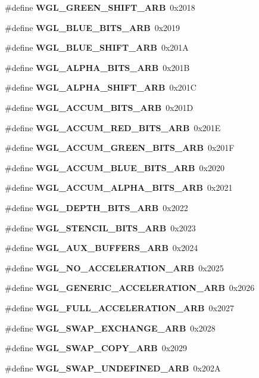 \begin{DoxyCompactItemize}
\item 
\#define {\bf W\+G\+L\+\_\+\+G\+R\+E\+E\+N\+\_\+\+S\+H\+I\+F\+T\+\_\+\+A\+RB}~0x2018
\item 
\#define {\bf W\+G\+L\+\_\+\+B\+L\+U\+E\+\_\+\+B\+I\+T\+S\+\_\+\+A\+RB}~0x2019
\item 
\#define {\bf W\+G\+L\+\_\+\+B\+L\+U\+E\+\_\+\+S\+H\+I\+F\+T\+\_\+\+A\+RB}~0x201A
\item 
\#define {\bf W\+G\+L\+\_\+\+A\+L\+P\+H\+A\+\_\+\+B\+I\+T\+S\+\_\+\+A\+RB}~0x201B
\item 
\#define {\bf W\+G\+L\+\_\+\+A\+L\+P\+H\+A\+\_\+\+S\+H\+I\+F\+T\+\_\+\+A\+RB}~0x201C
\item 
\#define {\bf W\+G\+L\+\_\+\+A\+C\+C\+U\+M\+\_\+\+B\+I\+T\+S\+\_\+\+A\+RB}~0x201D
\item 
\#define {\bf W\+G\+L\+\_\+\+A\+C\+C\+U\+M\+\_\+\+R\+E\+D\+\_\+\+B\+I\+T\+S\+\_\+\+A\+RB}~0x201E
\item 
\#define {\bf W\+G\+L\+\_\+\+A\+C\+C\+U\+M\+\_\+\+G\+R\+E\+E\+N\+\_\+\+B\+I\+T\+S\+\_\+\+A\+RB}~0x201F
\item 
\#define {\bf W\+G\+L\+\_\+\+A\+C\+C\+U\+M\+\_\+\+B\+L\+U\+E\+\_\+\+B\+I\+T\+S\+\_\+\+A\+RB}~0x2020
\item 
\#define {\bf W\+G\+L\+\_\+\+A\+C\+C\+U\+M\+\_\+\+A\+L\+P\+H\+A\+\_\+\+B\+I\+T\+S\+\_\+\+A\+RB}~0x2021
\item 
\#define {\bf W\+G\+L\+\_\+\+D\+E\+P\+T\+H\+\_\+\+B\+I\+T\+S\+\_\+\+A\+RB}~0x2022
\item 
\#define {\bf W\+G\+L\+\_\+\+S\+T\+E\+N\+C\+I\+L\+\_\+\+B\+I\+T\+S\+\_\+\+A\+RB}~0x2023
\item 
\#define {\bf W\+G\+L\+\_\+\+A\+U\+X\+\_\+\+B\+U\+F\+F\+E\+R\+S\+\_\+\+A\+RB}~0x2024
\item 
\#define {\bf W\+G\+L\+\_\+\+N\+O\+\_\+\+A\+C\+C\+E\+L\+E\+R\+A\+T\+I\+O\+N\+\_\+\+A\+RB}~0x2025
\item 
\#define {\bf W\+G\+L\+\_\+\+G\+E\+N\+E\+R\+I\+C\+\_\+\+A\+C\+C\+E\+L\+E\+R\+A\+T\+I\+O\+N\+\_\+\+A\+RB}~0x2026
\item 
\#define {\bf W\+G\+L\+\_\+\+F\+U\+L\+L\+\_\+\+A\+C\+C\+E\+L\+E\+R\+A\+T\+I\+O\+N\+\_\+\+A\+RB}~0x2027
\item 
\#define {\bf W\+G\+L\+\_\+\+S\+W\+A\+P\+\_\+\+E\+X\+C\+H\+A\+N\+G\+E\+\_\+\+A\+RB}~0x2028
\item 
\#define {\bf W\+G\+L\+\_\+\+S\+W\+A\+P\+\_\+\+C\+O\+P\+Y\+\_\+\+A\+RB}~0x2029
\item 
\#define {\bf W\+G\+L\+\_\+\+S\+W\+A\+P\+\_\+\+U\+N\+D\+E\+F\+I\+N\+E\+D\+\_\+\+A\+RB}~0x202A

\end{DoxyCompactItemize}
